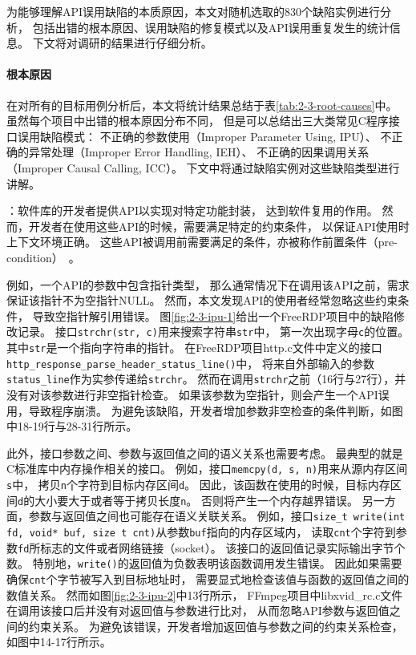 为能够理解API误用缺陷的本质原因，本文对随机选取的830个缺陷实例进行分析，
包括出错的根本原因、误用缺陷的修复模式以及API误用重复发生的统计信息。
下文将对调研的结果进行仔细分析。


\paragraph{根本原因}

在对所有的目标用例分析后，本文将统计结果总结于表\ref{tab:2-3-root-causes}中。
虽然每个项目中出错的根本原因分布不同，
但是可以总结出三大类常见C程序接口误用缺陷模式：
不正确的参数使用（Improper Parameter Using, IPU）、
不正确的异常处理（Improper Error Handling, IEH）、
不正确的因果调用关系（Improper Causal Calling, ICC）。
下文中将通过缺陷实例对这些缺陷类型进行讲解。



：软件库的开发者提供API以实现对特定功能封装，
达到软件复用的作用。
然而，开发者在使用这些API的时候，需要满足特定的约束条件，
以保证API使用时上下文环境正确。
这些API被调用前需要满足的条件，亦被称作前置条件（pre-condition）~\cite{14-fse-pre}。

例如，一个API的参数中包含指针类型，
那么通常情况下在调用该API之前，需求保证该指针不为空指针NULL。
然而，本文发现API的使用者经常忽略这些约束条件，
导致空指针解引用错误。
图\ref{fig:2-3-ipu-1}给出一个FreeRDP项目中的缺陷修改记录。
接口\texttt{strchr(str, c)}用来搜索字符串\texttt{str}中，
第一次出现字母\texttt{c}的位置。
其中\texttt{str}是一个指向字符串的指针。
在FreeRDP项目http.c文件中定义的接口\texttt{http\_response\_parse\_header\_status\_line()}中，
将来自外部输入的参数\texttt{status\_line}作为实参传递给\texttt{strchr}。
然而在调用\texttt{strchr}之前（16行与27行），并没有对该参数进行非空指针检查。
如果该参数为空指针，则会产生一个API误用，导致程序崩溃。
为避免该缺陷，开发者增加参数非空检查的条件判断，如图中18-19行与28-31行所示。



此外，接口参数之间、参数与返回值之间的语义关系也需要考虑。
最典型的就是C标准库中内存操作相关的接口。
例如，接口\texttt{memcpy(d, s, n)}用来从源内存区间\texttt{s}中，
拷贝\texttt{n}个字符到目标内存区间\texttt{d}。
因此，该函数在使用的时候，目标内存区间\texttt{d}的大小要大于或者等于拷贝长度\texttt{n}。
否则将产生一个内存越界错误。
另一方面，参数与返回值之间也可能存在语义关联关系。
例如，接口\texttt{size\_t write(int fd, void* buf, size t cnt)}从参数\texttt{buf}指向的内存区域内，
读取\texttt{cnt}个字符到参数\texttt{fd}所标志的文件或者网络链接（socket）。
该接口的返回值记录实际输出字节个数。
特别地，\texttt{write()}的返回值为负数表明该函数调用发生错误。
因此如果需要确保\texttt{cnt}个字节被写入到目标地址时，
需要显式地检查该值与函数的返回值之间的数值关系。
然而如图\ref{fig:2-3-ipu-2}中13行所示，
FFmpeg项目中libxvid\_rc.c文件在调用该接口后并没有对返回值与参数进行比对，
从而忽略API参数与返回值之间的约束关系。
为避免该错误，开发者增加返回值与参数之间的约束关系检查，如图中14-17行所示。


